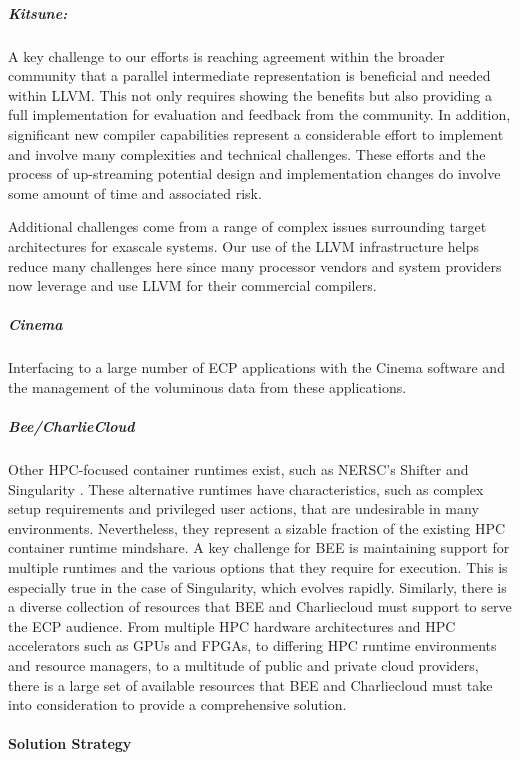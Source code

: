 \subparagraph{Kitsune:}
A key challenge to our efforts is reaching agreement within the broader community that
a parallel intermediate representation is beneficial and needed within
LLVM.  This not only requires showing the benefits but also providing a
full implementation for evaluation and feedback from the community.
In addition, significant new compiler capabilities represent a
considerable effort to implement and involve many complexities and technical
challenges.  These efforts and the process of up-streaming potential
design and implementation changes do involve some amount of time and
associated risk. 

Additional challenges come from a range of complex issues surrounding
target architectures for exascale systems.  Our use of the LLVM
infrastructure helps reduce many challenges here since many processor
vendors and system providers now leverage and use LLVM for their
commercial compilers.

\subparagraph{Cinema}
Interfacing to a large number of ECP applications with the Cinema
software and the management of the voluminous data from these
applications. 

\subparagraph{Bee/CharlieCloud}
Other HPC-focused container runtimes exist, such as NERSC's Shifter
\cite{canonrsjacobsend} and
Singularity \cite{kurtzergmsochatvbauermw}.  These alternative runtimes have characteristics, such as
complex setup requirements and privileged user actions, that are undesirable in
many environments.  Nevertheless, they represent a sizable fraction of the
existing HPC container runtime mindshare.  A key challenge for BEE is
maintaining support for multiple runtimes and the various options that they require
for execution.  This is especially true in the case of Singularity, which
evolves rapidly.  Similarly, there is a diverse collection of resources that
BEE and Charliecloud must support to serve the ECP audience.  From multiple HPC
hardware architectures and HPC accelerators such as GPUs and FPGAs, to
differing HPC runtime environments and resource managers, to a multitude of
public and private cloud providers, there is a large set of available resources
that BEE and Charliecloud must take into consideration to provide a
comprehensive solution.

\paragraph{Solution Strategy} \leavevmode \\

